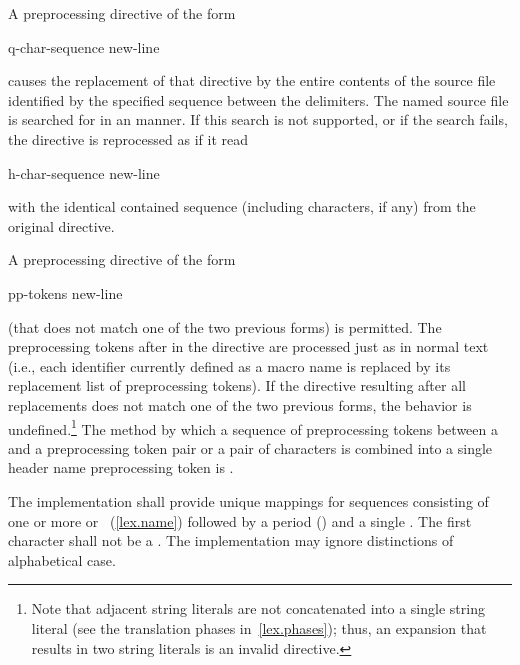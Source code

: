 \pnum
{}%
A preprocessing directive of the form

\begin{ncsimplebnf}
q-char-sequence new-line
\end{ncsimplebnf}

causes the replacement of that
directive by the entire contents of the
source file identified by the specified sequence between the
delimiters.
The named source file is searched for in an
manner.
If this search is not supported,
or if the search fails,
the directive is reprocessed as if it read

\begin{ncsimplebnf}
h-char-sequence\terminal{>} new-line
\end{ncsimplebnf}

with the identical contained sequence (including
\tcode{>}
characters, if any) from the original directive.

\pnum
A preprocessing directive of the form

\begin{ncsimplebnf}
 pp-tokens new-line
\end{ncsimplebnf}

(that does not match one of the two previous forms) is permitted.
The preprocessing tokens after
in the directive are processed just as in normal text
(i.e., each identifier currently defined as a macro name is replaced by its
replacement list of preprocessing tokens).
If the directive resulting after all replacements does not match
one of the two previous forms, the behavior is
undefined.\footnote{Note that adjacent string literals are not concatenated into
a single string literal
(see the translation phases in~\ref{lex.phases});
thus, an expansion that results in two string literals is an
invalid directive.}
The method by which a sequence of preprocessing tokens between a
\tcode{<}
and a
\tcode{>}
preprocessing token pair or a pair of
characters is combined into a single header name
preprocessing token is .

\pnum
The implementation shall provide unique mappings for
sequences consisting of one or more
 or ~(\ref{lex.name})
followed by a period
()
and a single
.
The first character shall not be a .
The implementation may ignore distinctions of alphabetical case.

